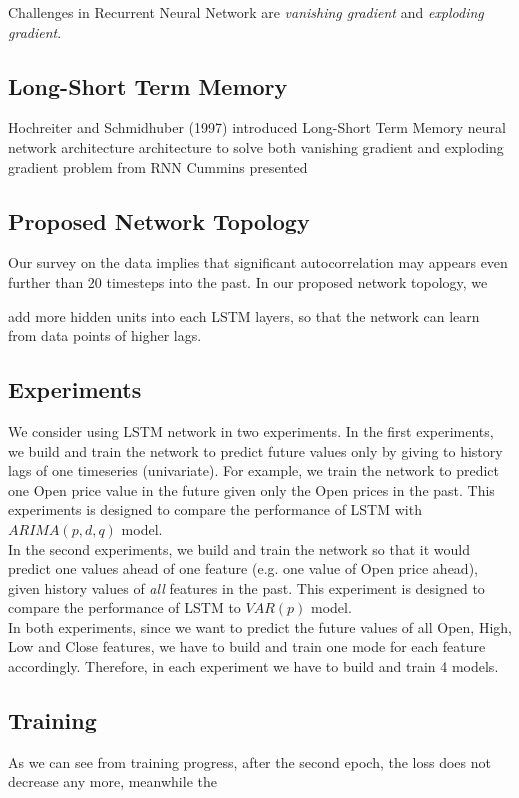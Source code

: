 \documentclass[11pt]{article}
\begin{document}
Challenges in Recurrent Neural Network are \textit{vanishing gradient} and
\textit{exploding gradient}.

\subsection{Long-Short Term Memory}
Hochreiter and Schmidhuber (1997) \cite{gers1999learning} introduced Long-Short
Term Memory neural network architecture architecture to solve both vanishing
gradient and exploding gradient problem from RNN Cummins presented

\subsection{Proposed Network Topology}
Our survey on the data implies that significant autocorrelation may appears even
further than 20 timesteps into the past. In our proposed network topology, we

add more hidden units into each LSTM layers, so that the network can learn from
data points of higher lags.

\subsection{Experiments}
We consider using LSTM network in two experiments. In the first experiments, we
build and train the network to predict future values only by giving to history
lags of one timeseries (univariate). For example, we train the network to
predict one Open price value in the future given only the Open prices in the
past. This experiments is designed to compare the performance of LSTM with
$ARIMA(p, d, q)$ model.\\ 
In the second experiments, we build and train the network so that it would
predict one values ahead of one feature (e.g. one value of Open price ahead),
given history values of \textit{all} features in the past. This experiment is
designed to compare the performance of LSTM to $VAR(p)$ model.\\
In both experiments, since we want to predict the future values of all Open,
High, Low and Close features, we have to build and train one mode for each
feature accordingly. Therefore, in each experiment we have to build and train 4
models.

\subsection{Training}
As we can see from training progress, after the second epoch, the loss does not decrease any more, meanwhile the
\end{document}
